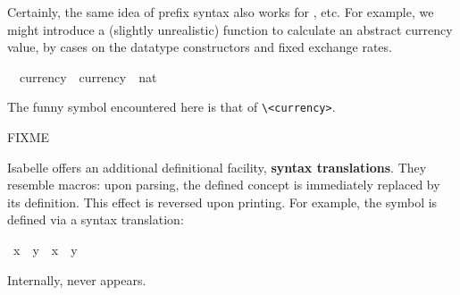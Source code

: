 \begin{isabellebody}
\begin{isamarkuptext}
  \medskip Certainly, the same idea of prefix syntax also works for
  ,  etc.  For example, we
  might introduce a (slightly unrealistic) function to calculate an
  abstract currency value, by cases on the datatype constructors and
  fixed exchange rates.%
\end{isamarkuptext}%
\isamarkuptrue%
\isanewline
\ \ currency\ {\isacharcolon}{\isacharcolon}\ {\isachardoublequote}currency\ {\isasymRightarrow}\ nat{\isachardoublequote}\ \ \ \ {\isacharparenleft}{\isachardoublequote}{\isasymcurrency}{\isachardoublequote}{\isacharparenright}\isamarkupfalse%
%
\begin{isamarkuptext}%
\noindent The funny symbol encountered here is that of
  \verb,\<currency>,.%
\end{isamarkuptext}%
\isamarkuptrue%
%
\isamarkuptrue%
%
\begin{isamarkuptext}%
FIXME

%
Isabelle offers an additional definitional facility,
\textbf{syntax translations}.
They resemble macros: upon parsing, the defined concept is immediately
replaced by its definition.  This effect is reversed upon printing.  For example,
the symbol \isa{{\isasymnoteq}} is defined via a syntax translation:%
\end{isamarkuptext}%
\isamarkuptrue%
\ {\isachardoublequote}x\ {\isasymnoteq}\ y{\isachardoublequote}\ {\isasymrightleftharpoons}\ {\isachardoublequote}{\isasymnot}{\isacharparenleft}x\ {\isacharequal}\ y{\isacharparenright}{\isachardoublequote}\isamarkupfalse%
%
\begin{isamarkuptext}%
\noindent
Internally, \isa{{\isasymnoteq}} never appears.


\end{isamarkuptext}
\end{isabellebody}
